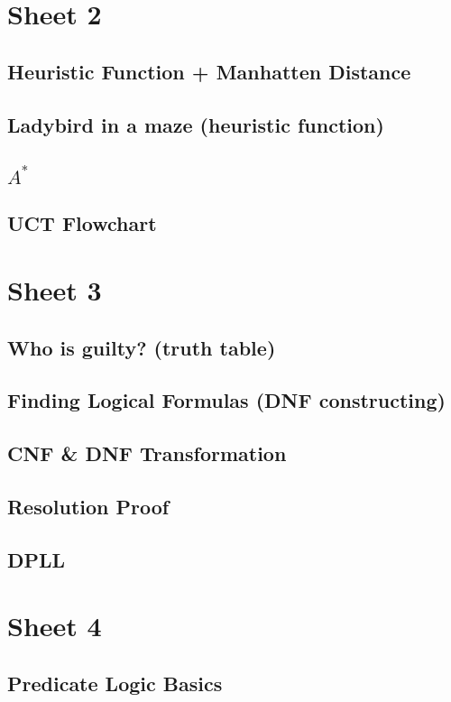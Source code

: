 \documentclass{article}
\begin{document}
\section{Sheet 2}
    \subsection{Heuristic Function + Manhatten Distance}
    \subsection{Ladybird in a maze (heuristic function)}
    \subsection{$A^*$}
    \subsection{UCT Flowchart}
    

\section{Sheet 3}
    \subsection{Who is guilty? (truth table)}
    \subsection{Finding Logical Formulas (DNF constructing)}
    \subsection{CNF & DNF Transformation}
    \subsection{Resolution Proof}
    \subsection{DPLL}
    

\section{Sheet 4}
    \subsection{Predicate Logic Basics}
\end{document}
